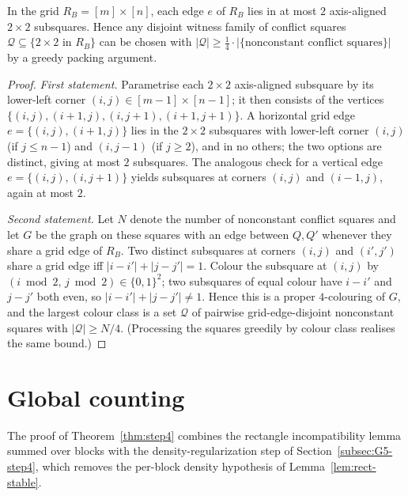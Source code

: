 \begin{lemma}
\label{lem:square-multiplicity}
In the grid $R_B=[m]\times[n]$, each edge $e$ of $R_B$ lies in at most
$2$ axis-aligned $2\times2$ subsquares. Hence any disjoint witness
family of conflict squares $\mathcal Q\subseteq\{2\times2\text{ in }R_B\}$
can be chosen with $|\mathcal Q|\ge\tfrac14\cdot|\{\text{nonconstant
conflict squares}\}|$ by a greedy packing argument.
\end{lemma}

\begin{proof}
\emph{First statement.} Parametrise each $2\times2$ axis-aligned subsquare
by its lower-left corner $(i,j)\in[m-1]\times[n-1]$; it then consists of
the vertices $\{(i,j),(i+1,j),(i,j+1),(i+1,j+1)\}$. A horizontal grid
edge $e=\{(i,j),(i+1,j)\}$ lies in the $2\times2$ subsquares with
lower-left corner $(i,j)$ (if $j\le n-1$) and $(i,j-1)$ (if $j\ge 2$),
and in no others; the two options are distinct, giving at most $2$
subsquares. The analogous check for a vertical edge
$e=\{(i,j),(i,j+1)\}$ yields subsquares at corners $(i,j)$ and $(i-1,j)$,
again at most $2$.

\emph{Second statement.} Let $N$ denote the number of nonconstant
conflict squares and let $G$ be the graph on these squares with an edge
between $Q,Q'$ whenever they share a grid edge of $R_B$. Two distinct
subsquares at corners $(i,j)$ and $(i',j')$ share a grid edge iff
$|i-i'|+|j-j'|=1$. Colour the subsquare at $(i,j)$ by
$(i\bmod 2,\,j\bmod 2)\in\{0,1\}^2$; two subsquares of equal colour have
$i-i'$ and $j-j'$ both even, so $|i-i'|+|j-j'|\ne 1$. Hence this is a
proper $4$-colouring of $G$, and the largest colour class is a set
$\mathcal Q$ of pairwise grid-edge-disjoint nonconstant squares with
$|\mathcal Q|\ge N/4$. (Processing the squares greedily by colour class
realises the same bound.)
\end{proof}

\section{Global counting}
\label{sec:global-counting}

The proof of Theorem~\ref{thm:step4} combines the rectangle
incompatibility lemma summed over blocks with the density-regularization
step of Section~\ref{subsec:G5-step4}, which removes the per-block density
hypothesis of Lemma~\ref{lem:rect-stable}.

